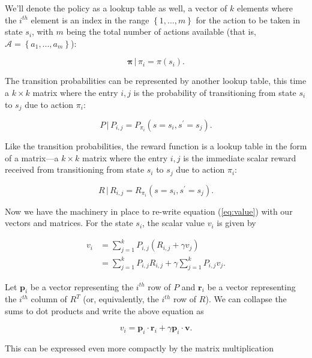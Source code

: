 \documentclass[12pt]{article}
\begin{document}
We'll denote the policy as a lookup table as well, a vector of $k$ elements where the $i^{th}$ element is an index in the range $\left\{1, ..., m\right\}$ for the action to be taken in state $s_i$, with $m$ being the total number of actions available (that is, $\mathscr{A} = \left\{a_1, ..., a_m\right\}$):

\begin{equation}
\mathbf{\pi} \, | \, \pi_i = \pi(s_i).
\end{equation}

The transition probabilities can be represented by another lookup table, this time a $k \times k$ matrix where the entry $i,j$ is the probability of transitioning from state $s_i$ to $s_j$ due to action $\pi_i$:

\begin{equation}
P \, | \, P_{i,j} = P_{\pi_i}(s = s_i, s^\prime = s_j).
\end{equation}

Like the transition probabilities, the reward function is a lookup table in the form of a matrix---a $k \times k$ matrix where the entry $i,j$ is the immediate scalar reward received from transitioning from state $s_i$ to $s_j$ due to action $\pi_i$:

\begin{equation}
R \, | \, R_{i,j} = R_{\pi_i}(s = s_i, s^\prime = s_j).
\end{equation}

Now we have the machinery in place to re-write equation (\ref{eq:value}) with our vectors and matrices. For the state $s_i$, the scalar value $v_i$ is given by

\begin{align}
v_i &= \sum_{j = 1}^k P_{i,j}(R_{i,j} + \gamma v_j) \\[5pt]
&= \sum_{j = 1}^k P_{i,j} R_{i,j} + \gamma \sum_{j = 1}^k P_{i,j} v_j.
\end{align}

Let $\mathbf{p}_i$ be a vector representing the $i^{th}$ row of $P$ and $\mathbf{r}_i$ be a vector representing the $i^{th}$ column of $R^T$ (or, equivalently, the $i^{th}$ row of $R$). We can collapse the sums to dot products and write the above equation as

\begin{equation}
v_i = \mathbf{p}_i \cdot \mathbf{r}_i + \gamma \mathbf{p}_i \cdot \mathbf{v}.
\end{equation}

This can be expressed even more compactly by the matrix multiplication
\end{document}
